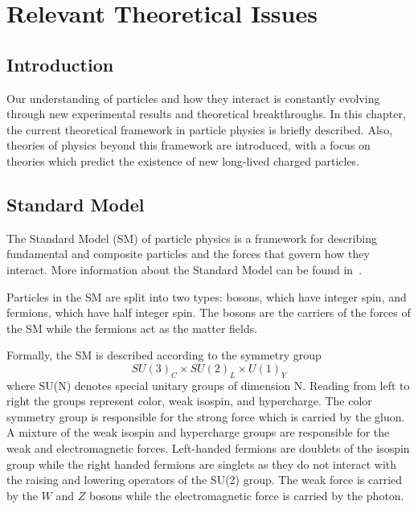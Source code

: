 \chapter{Relevant Theoretical Issues \label{sec:theory}}

\section{Introduction}
Our understanding of particles and how they interact is constantly evolving through new experimental results and theoretical breakthroughs.
In this chapter, the current theoretical framework in particle physics is briefly described. Also, theories of physics beyond this framework are introduced,
with a focus on theories which predict the existence of new long-lived charged particles.

\section{Standard Model \label{sec:SM}}
The Standard Model (SM) of particle physics is a framework for describing fundamental and composite particles and the forces that govern how they interact. 
More information about the Standard Model can be found in~\cite{griffiths2008introduction, Srednicki_2007}.

Particles in the SM are split into two types: bosons, which have integer spin, and fermions, which have half integer spin.
The bosons are the carriers of the forces of the SM while the fermions act as the matter fields.


Formally, the SM is described according to the symmetry group
\begin{equation}
SU(3)_C \times SU(2)_L \times U(1)_Y
\label{eq:SMGroups}
\end{equation}
where SU(N) denotes special unitary groups of dimension N. 
Reading from left to right the groups represent color, weak isospin, and hypercharge. 
The color symmetry group is responsible for the strong force which is carried by the gluon.
A mixture of the weak isospin and hypercharge groups are responsible for the weak and electromagnetic forces. Left-handed fermions are doublets of the
isospin group while the right handed fermions are singlets as they do not interact with the raising and lowering operators of the SU(2) group.
The weak force is carried by the $W$ and $Z$ bosons while the electromagnetic force is carried by the photon.

